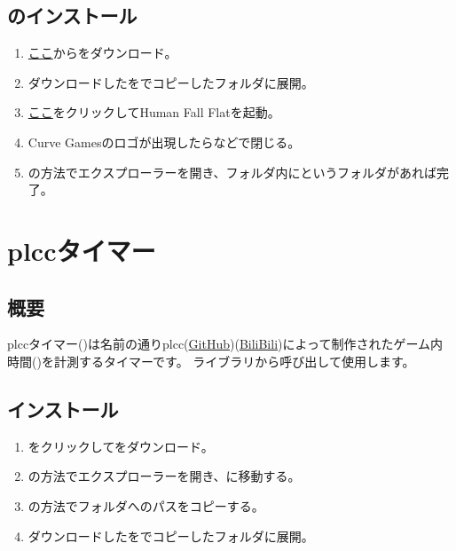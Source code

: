 \documentclass[lualatex,a4paper,fontsize=11pt,jafontscale=0.9247,titlepage,oneside]{jlreq}
\begin{document}
\subsection{のインストール}
\begin{enumerate}
\item \href{https://github.com/BepInEx/BepInEx/releases/latest}{ここ}からをダウンロード。
\item ダウンロードしたを\hyperref[3.1.3]{}でコピーしたフォルダに展開。
\item \href{steam://rungameid/477160}{ここ}をクリックしてHuman Fall Flatを起動。
\item Curve Gamesのロゴが出現したらなどで閉じる。
\item \hyperref[3.1.2]{}の方法でエクスプローラーを開き、フォルダ内にというフォルダがあれば完了。
\end{enumerate}
\section{plccタイマー}
\subsection{概要}
plccタイマー()は名前の通りplcc(\href{https://github.com/plcc0}{GitHub})(\href{https://space.bilibili.com/111277972}{BiliBili})によって制作されたゲーム内時間()を計測するタイマーです。\parr
{}ライブラリから呼び出して使用します。
\subsection{インストール}
\begin{enumerate}   
\item \href{https://github.com/Msgame79/hffmods/raw/refs/heads/main/plcc's%20timer/1.7.4/%E6%97%A5%E6%9C%AC%E8%AA%9E.zip}{\mono{ここ}}をクリックして\mono{日本語.zip}をダウンロード。
\item \hyperref[3.1.2]{}の方法でエクスプローラーを開き、に移動する。
\item \label{4.2.3}\hyperref[3.1.3]{}の方法でフォルダへのパスをコピーする。
\item ダウンロードしたを\hyperref[4.2.3]{}でコピーしたフォルダに展開。
\end{enumerate}
\end{document}
